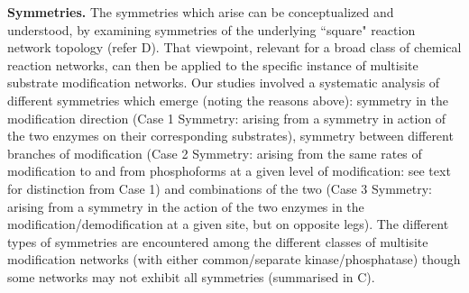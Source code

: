 \documentclass[9pt,lineno]{elife}
\begin{document}
{\bf Symmetries.} The symmetries which arise can be conceptualized and understood, by examining
symmetries of the underlying ``square" reaction network topology (refer D). 
That viewpoint, relevant for a broad class
of chemical reaction networks,  can then be applied to the specific instance of multisite substrate modification networks.
Our studies involved a systematic analysis of different symmetries which emerge (noting the reasons above): symmetry in the modification direction (Case 1 Symmetry: arising from a symmetry in action of the two enzymes on their corresponding substrates), symmetry between different branches of modification (Case 2 Symmetry: arising from the same rates of modification to and from phosphoforms at a given level of modification: see text for distinction from Case 1) and combinations of the two (Case 3 Symmetry: arising from a symmetry in the action of the two enzymes in the modification/demodification at a given site, but on opposite legs). 
The different types of symmetries are encountered among the different classes of multisite modification networks (with either common/separate kinase/phosphatase) though some networks may not exhibit all symmetries (summarised in C).
\end{document}
